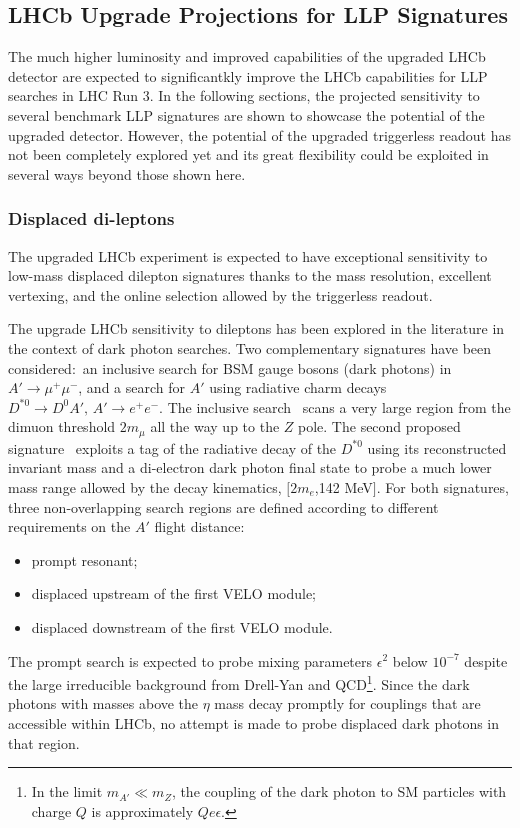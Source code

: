 \subsection{LHCb Upgrade Projections for LLP Signatures}
\label{sec:ulhcbphys}

The much higher luminosity and improved capabilities of the upgraded LHCb detector are expected to significantkly improve the LHCb capabilities for LLP searches in LHC Run 3. In the following sections, the projected sensitivity to several benchmark LLP signatures are shown to showcase the potential of the upgraded detector. However, the potential of the upgraded triggerless readout has not been completely explored yet and its great flexibility could be exploited in several ways beyond those shown here.

\subsubsection{Displaced di-leptons}
The upgraded LHCb experiment is expected to have exceptional sensitivity to low-mass displaced dilepton signatures thanks to the mass resolution, excellent vertexing, and the online selection allowed by the triggerless readout.

The upgrade LHCb sensitivity to dileptons has been explored in the literature in the context of dark photon searches. Two complementary signatures have been considered:~an inclusive search for BSM gauge bosons (dark photons) in $A'\to \mu^+\mu^-$, and a search for  $A'$ using radiative charm decays $D^{*0}\to D^{0}A',\,A'\rightarrow e^+e^-$.
The inclusive search~\cite{Ilten:2016tkc} scans a very large region from the dimuon threshold $2m_{\mu}$ all the way up to the $Z$ pole. The second proposed signature~\cite{Ilten:2015hya} exploits a tag of the radiative decay of the $D^{*0}$ using its reconstructed invariant mass and a di-electron dark photon final state to probe a much lower mass range allowed by the decay kinematics, $[2m_{e}$,142 MeV$]$.
For both signatures, three non-overlapping search regions are defined according to different requirements on the $A'$ flight distance:
%
\begin{itemize}
\item prompt resonant;
\item displaced upstream of the first VELO module;
\item displaced downstream of the first VELO module.
\end{itemize}
%
The prompt search is expected to probe mixing parameters $\epsilon^2$ below $10^{-7}$ despite the large irreducible background from Drell-Yan and QCD\footnote{In the limit $m_{A'}\ll m_Z$, the coupling of the dark photon to SM particles with charge $Q$ is approximately $Qe\epsilon$.}.
Since the dark photons with masses above the $\eta$ mass decay promptly for couplings that are accessible within LHCb, no attempt is made to probe displaced dark photons in that region.

